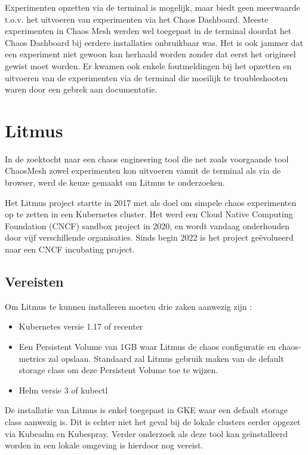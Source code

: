 Experimenten opzetten via de terminal is mogelijk, maar biedt geen meerwaarde t.o.v. het uitvoeren van experimenten via het Chaos Dashboard. Meeste experimenten in Chaos Mesh werden wel toegepast in de terminal doordat het Chaos Dashboard bij eerdere installaties onbruikbaar was. Het is ook jammer dat een experiment niet gewoon kan herhaald worden zonder dat eerst het origineel gewist moet worden. Er kwamen ook enkele foutmeldingen bij het opzetten en uitvoeren van de experimenten via de terminal die moeilijk te troubleshooten waren door een gebrek aan documentatie.  
 
\section{Litmus}

In de zoektocht naar een chaos engineering tool die net zoals voorgaande tool ChaosMesh zowel experimenten kon uitvoeren vanuit de terminal als via de browser, werd de keuze gemaakt om Litmus te onderzoeken. 

Het Litmus project startte in 2017 met als doel om simpele chaos experimenten op te zetten in een Kubernetes cluster. Het werd een Cloud Native Computing Foundation (CNCF) sandbox project in 2020, en wordt vandaag onderhouden door vijf verschillende organisaties. Sinds begin 2022 is het project geëvolueerd naar een CNCF incubating project. \autocite{CNCF2022}

\subsection {Vereisten}
\label{sec:litmusvereisten}

Om Litmus te kunnen installeren moeten drie zaken aanwezig zijn \autocite{Litmus2022}: 
\begin{itemize}
    \item Kubernetes versie 1.17 of recenter
    \item Een Persistent Volume van 1GB waar Litmus de chaos configuratie en chaos-metrics zal opslaan. Standaard zal Litmus gebruik maken van de default storage class om deze Persistent Volume toe te wijzen.
    \item Helm versie 3 of kubectl 
\end{itemize}

De installatie van Litmus is enkel toegepast in GKE waar een default storage class aanwezig is. Dit is echter niet het geval bij de lokale clusters eerder opgezet via Kubeadm en Kubespray. Verder onderzoek als deze tool kan geïnstalleerd worden in een lokale omgeving is hierdoor nog vereist. 

